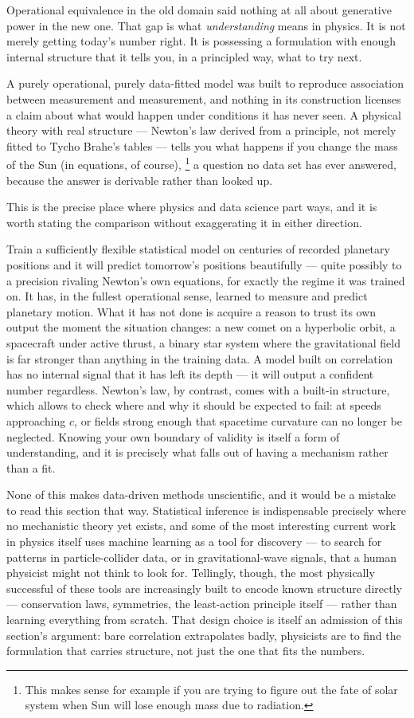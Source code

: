 Operational equivalence in the old domain said nothing at all
about generative power in the new one. That gap is what
\emph{understanding} means in physics. It is not merely getting
today's number right. It is possessing a formulation with enough
internal structure that it tells you, in a principled way, what
to try next.

A purely operational, purely data-fitted model was built to reproduce association between
measurement and measurement, and nothing in its construction licenses a claim
about what would happen under conditions it has never seen. A physical theory
with real structure --- Newton's law derived from a principle, not merely
fitted to Tycho Brahe's tables ---  tells you what happens if you change the mass
of the Sun (in equations, of course),
\footnote{This makes sense for example if you are trying
to figure out the fate of solar system when Sun will lose enough mass due 
to radiation.}
a question no data set has ever answered, because the answer is
derivable rather than looked up.

This is the precise place where physics and data science part ways, and it is
worth stating the comparison without exaggerating it in either direction.

Train a sufficiently flexible statistical model on centuries of recorded
planetary positions and it will predict tomorrow's positions beautifully ---
quite possibly to a precision rivaling Newton's own equations, for exactly the
regime it was trained on. It has, in the fullest operational sense, learned to
measure and predict planetary motion. What it has not done is acquire a reason
to trust its own output the moment the situation changes: a new comet on a
hyperbolic orbit, a spacecraft under active thrust, a binary star system where
the gravitational field is far stronger than anything in the training data. A
model built on correlation has no internal signal that it has left its depth
--- it will output a confident number regardless. Newton's law, by contrast,
comes with a built-in structure, which allows to check where and why it should be
expected to fail: at speeds approaching $c$, or fields strong enough that
spacetime curvature can no longer be neglected. Knowing your own boundary of
validity is itself a form of understanding, and it is precisely what falls out
of having a mechanism rather than a fit.

None of this makes data-driven methods unscientific, and it would be a mistake
to read this section that way. Statistical inference is indispensable precisely
where no mechanistic theory yet exists, and some of the most interesting
current work in physics itself uses machine learning as a tool for discovery
--- to search for patterns in particle-collider data, or in gravitational-wave
signals, that a human physicist might not think to look for. Tellingly, though,
the most physically successful of these tools are increasingly built to encode
known structure directly --- conservation laws, symmetries, the least-action
principle itself --- rather than learning everything from scratch. That design
choice is itself an admission of this section's argument: bare correlation
extrapolates badly, physicists are to find the formulation that carries 
structure, not just the one that fits the numbers.

